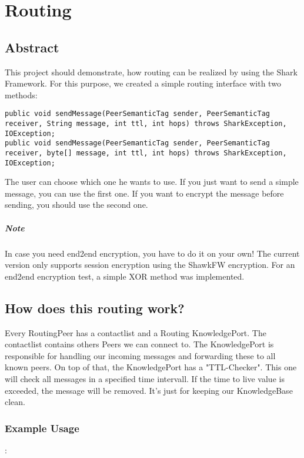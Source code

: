 \chapter{Routing}
\section{Abstract}
This project should demonstrate, how routing can be realized by using the Shark Framework. For this purpose, we created a 
simple routing interface with two methods:

\begin{verbatim}
public void sendMessage(PeerSemanticTag sender, PeerSemanticTag receiver, String message, int ttl, int hops) throws SharkException, IOException;
public void sendMessage(PeerSemanticTag sender, PeerSemanticTag receiver, byte[] message, int ttl, int hops) throws SharkException, IOException;
\end{verbatim}

The user can choose which one he wants to use. If you just want to send a simple message, you can use the first one. If
you want to encrypt the message before sending, you should use the second one.\\

\paragraph{Note} In case you need end2end encryption, you have to do it on your own! The current version only supports session encryption using the ShawkFW encryption. For an end2end encryption test, a simple XOR method was implemented.

\section{How does this routing work?}

Every RoutingPeer has a contactlist and a Routing KnowledgePort. The contactlist contains others Peers we can connect to. 
The KnowledgePort is responsible for handling our incoming messages and forwarding these to all known peers. On top of that,
the KnowledgePort has a "TTL-Checker". This one will check all messages in a specified time intervall. If the time to live
value is exceeded, the message will be removed. It's just for keeping our KnowledgeBase clean.

\subsection{Example Usage}:

